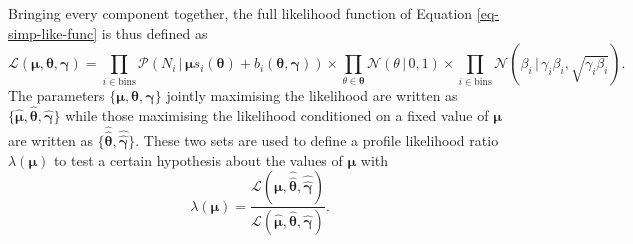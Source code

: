 Bringing every component together, the full likelihood function of Equation \ref{eq-simp-like-func} is thus defined as
\begin{equation}
\mathcal{L}\left(\boldsymbol{\mu}, \boldsymbol{\theta}, \boldsymbol{\gamma}\right) = \prod_{i\in \textrm{bins}} \mathcal{P}(N_i \,|\, \boldsymbol{\mu} s_i(\boldsymbol{\theta}) + b_i(\boldsymbol{\theta}, \boldsymbol{\gamma})) \times  \prod_{\theta \in \boldsymbol{\theta}} \mathcal{N}(\theta \,|\, 0, 1) \times \prod_{i \in \textrm{bins}} \mathcal{N}(\beta_i \,|\, \gamma_i \beta_i, \sqrt{\gamma_i \beta_i}).
\end{equation}
The parameters $\{\boldsymbol{\mu}, \boldsymbol{\theta}, \boldsymbol{\gamma}\}$ jointly maximising the likelihood are written as $\{\hat{\boldsymbol{\mu}}, \hat{\boldsymbol{\theta}}, \hat{\boldsymbol{\gamma}}\}$ while those maximising the likelihood conditioned on a fixed value of $\boldsymbol{\mu}$ are written as $\{\hat{\hat{\boldsymbol{\theta}}}, \hat{\hat{\boldsymbol{\gamma}}}\}$. These two sets are used to define a profile likelihood ratio $\lambda(\boldsymbol{\mu})$ to test a certain hypothesis about the values of $\boldsymbol{\mu}$ with
\begin{equation}\label{eq-lik-ratio}
    \lambda(\boldsymbol{\mu}) = \frac{\mathcal{L}\left(\boldsymbol{\mu}, \hat{\hat{\boldsymbol{\theta}}}, \hat{\hat{\boldsymbol{\gamma}}} \right)}{\mathcal{L}\left(\hat{\boldsymbol{\mu}}, \hat{\boldsymbol{\theta}}, \hat{\boldsymbol{\gamma}} \right)}.
\end{equation}

